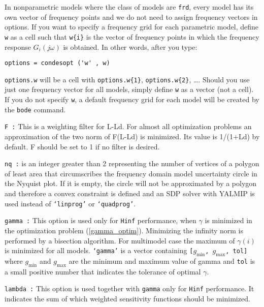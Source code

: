 \documentclass [12pt , a4paper] {report}
\begin{document}
\begin{description}
\item[\texttt{w :}] In nonparametric models where the class of models are \texttt{frd}, every model has its own vector of frequency points and we do not need to assign frequency vectors in options. 
If you want to specify a frequency grid for each parametric model, define \texttt{w} as a cell such that \texttt{w\{i\}} is the vector of frequency points in which the frequency response $G_i(j\omega)$ is obtained. In other words, after you type:
\begin{lstlisting}
options = condesopt ('w' , w)
\end{lstlisting}
\texttt{options.w} will be a cell with \texttt{options.w\{1\}}, \texttt{options.w\{2\}}, \dots. Should you use just one frequency vector for all models, simply define \texttt{w} as a vector (not a cell). If you do not specify \texttt{w}, a default frequency grid for each model will be created by the \texttt{bode} command. 

\item{\tt F :}      This is a weighting filter for L-Ld. For almost all optimization problems an approximation of the two norm of F(L-Ld) is minimized. Its value is 1/(1+Ld) by default. F should be set to 1 if no filter is desired.


\item{\tt nq :}  is an integer greater than 2 representing the number of vertices of a polygon of least area that circumscribes 
the frequency domain model uncertainty circle in the Nyquist plot. If it is empty, the circle will not be approximated 
by a polygon and therefore a convex constraint is defined and an SDP solver with YALMIP is used instead of {\tt `linprog'} or {\tt `quadprog'}.    

 \item{\tt gamma :}    This option is used only for {\tt Hinf} performance, when $\gamma$ is minimized in the optimization problem (\ref{gamma_optim}).
 Minimizing the infinity norm is performed by a bisection algorithm. For multimodel case the
 maximum of $\gamma(i)$ is minimized for all models. {\tt `gamma'} is a vector containing {\tt [$g_{\min}$, $g_{\max}$, tol]} where $g_{\min}$ and $g_{\max}$ are the minimum and maximum value of gamma and {\tt tol} is a small positive number that indicates the tolerance of optimal $\gamma$.

 \item{\tt lambda :}   This option is used together with {\tt gamma} only for {\tt Hinf} performance. 
  It indicates the sum of which weighted sensitivity functions should be minimized. 
  

\end{description}
\end{document}
